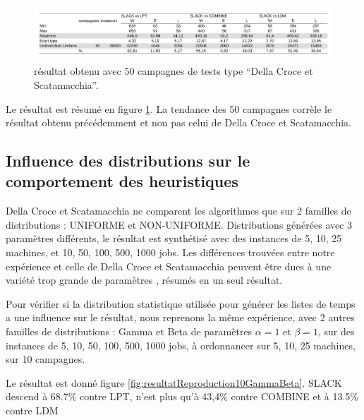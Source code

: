 \documentclass[a4paper,12pt]{report}
\theoremstyle{plain}				%
\theoremstyle{definition}				%
\begin{document}
\begin{figure}
{\centering
\includegraphics[width=\columnwidth]{4_Resultat_Reproduction50DCS.pdf}
\caption{résultat obtenu avec 50 campagnes de tests type ``Della Croce et Scatamacchia''.}
\label{fig:resultatReproduction50DellaCroceScatamacchia}
\par}
\end{figure}

Le résultat est résumé en figure \ref{fig:resultatReproduction50DellaCroceScatamacchia}. 
La tendance des 50 campagnes corrèle le résultat obtenu précédemment et non pas 
  celui de Della Croce et Scatamacchia.

\subsection{Influence des distributions sur le comportement des heuristiques}
\label{ssec:resultatsInfluenceDesDistributionSurLeComportement}


Della Croce et Scatamacchia ne comparent les algorithmes que sur 2 familles de distributions : 
UNIFORME et NON-UNIFORME. Distributions générées avec 3 paramètres différents, le résultat est synthétisé avec des instances de 5, 10, 25 machines, et 10, 50, 100, 500, 1000 jobs. 
Les différences trouvées entre notre expérience et celle de Della Croce et Scatamacchia peuvent 
être dues à une variété trop grande de paramètres , résumés en un seul résultat.

\bigskip
Pour vérifier si la distribution statistique utilisée pour générer les listes de temps 
  a une influence sur le résultat, 
  nous reprenons la même expérience, avec 2 autres familles de distributions : 
  Gamma et Beta de paramètres $\alpha = 1$ et $\beta = 1$,
  sur des instances de 5, 10, 50, 100, 500, 1000 jobs, 
  à ordonnancer sur 5, 10, 25 machines,
  sur 10 campagnes.

Le résultat est donné figure \ref{fig:resultatReproduction10GammaBeta}.
SLACK descend à 68.7\% contre LPT, 
n'est plus qu'à 43,4\% contre COMBINE et
à 13.5\% contre LDM
\end{document}

